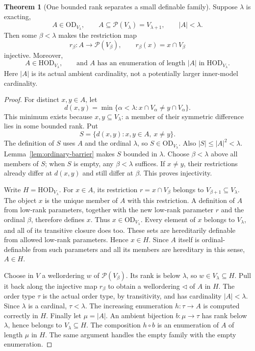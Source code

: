 \documentclass[11pt,letterpaper]{article}
\theoremstyle{definition}
\newtheorem{theorem}[definition]{Theorem}
\newcommand{\HOD}{\mathrm{HOD}}
\newcommand{\OD}{\mathrm{OD}}
\numberwithin{equation}{section}
\newcommand{\Pow}{\mathcal P}
\begin{document}
\begin{theorem}[One bounded rank separates a small definable family]\label{thm:separation}
Suppose $\lambda$ is exacting,
\[
       A\in\OD_{V_\lambda},\qquad A\subseteq\Pow(V_\lambda)=V_{\lambda+1},
       \qquad |A|<\lambda.
\]
Then some $\beta<\lambda$ makes the restriction map
\[
                   r_\beta:A\longrightarrow\Pow(V_\beta),
                   \qquad r_\beta(x)=x\cap V_\beta
\]
injective. Moreover,
\[
       A\in\HOD_{V_\lambda},
       \qquad \text{and $A$ has an enumeration of length $|A|$ in }
                       \HOD_{V_\lambda}.
\]
Here $|A|$ is its actual ambient cardinality, not a potentially larger
inner-model cardinality.
\end{theorem}

\begin{proof}
For distinct $x,y\in A$, let
\[
 d(x,y)=\min\{\alpha<\lambda:x\cap V_\alpha\ne y\cap V_\alpha\}.
\]
This minimum exists because $x,y\subseteq V_\lambda$: a member of their
symmetric difference lies in some bounded rank. Put
\[
                    S=\{d(x,y):x,y\in A,\ x\ne y\}.
\]
The definition of $S$ uses $A$ and the ordinal $\lambda$, so
$S\in\OD_{V_\lambda}$. Also $|S|\le|A|^2<\lambda$.
Lemma~\ref{lem:ordinary-barrier} makes $S$ bounded in $\lambda$.
Choose $\beta<\lambda$ above all members of $S$; when $S$ is empty, any
$\beta<\lambda$ suffices. If $x\ne y$, their restrictions already differ at
$d(x,y)$ and still differ at $\beta$. This proves injectivity.

Write $H=\HOD_{V_\lambda}$. For $x\in A$, its restriction
$r=x\cap V_\beta$ belongs to $V_{\beta+1}\subseteq V_\lambda$. The object $x$
is the unique member of $A$ with this restriction. A definition of $A$ from
low-rank parameters, together with the new low-rank parameter $r$ and the
ordinal $\beta$, therefore defines $x$. Thus $x\in\OD_{V_\lambda}$.
Every element of $x$ belongs to $V_\lambda$, and all of its transitive closure
does too. These sets are hereditarily definable from allowed low-rank
parameters. Hence $x\in H$. Since $A$ itself is ordinal-definable from such
parameters and all its members are hereditary in this sense, $A\in H$.

Choose in $V$ a wellordering $w$ of $\Pow(V_\beta)$. Its rank is below
$\lambda$, so $w\in V_\lambda\subseteq H$. Pull it back along the injective
map $r_\beta$ to obtain a wellordering $\triangleleft$ of $A$ in $H$.
The order type $\tau$ is the actual order type, by transitivity, and has
cardinality $|A|<\lambda$. Since $\lambda$ is a cardinal, $\tau<\lambda$.
The increasing enumeration $h:\tau\to A$ is computed correctly in $H$.
Finally let $\mu=|A|$. An ambient bijection $b:\mu\to\tau$ has rank below
$\lambda$, hence belongs to $V_\lambda\subseteq H$. The composition
$h\circ b$ is an enumeration of $A$ of length $\mu$ in $H$.
The same argument handles the empty family with the empty enumeration.
\end{proof}
\end{document}
